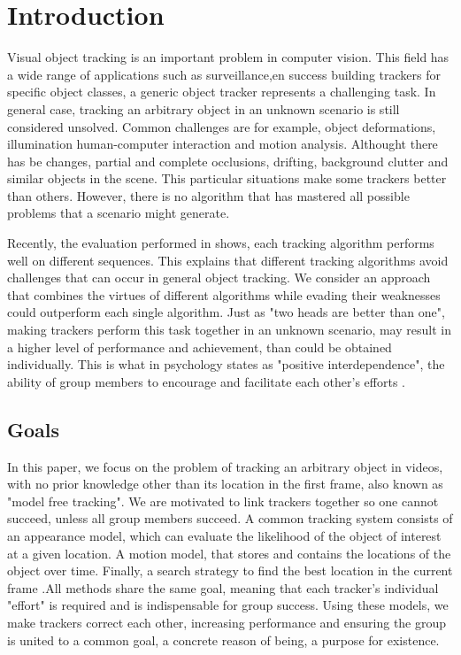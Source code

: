 
\chapter{Introduction} %

\label{Chapter1} %


Visual object tracking is an important problem in computer vision. This field has a wide range of applications such as surveillance,en success building trackers for specific object classes, a generic object tracker represents a challenging task. In general case, tracking an arbitrary object in an unknown scenario is still considered unsolved. Common challenges are for example, object deformations, illumination human-computer interaction and motion analysis. Althought there has be changes, partial and complete occlusions, drifting, background clutter and similar objects in the scene. This particular situations make some trackers better than others. However, there is no algorithm that has mastered all possible problems that a scenario might generate.

Recently, the evaluation performed in \cite{Wu2013} shows, each tracking algorithm performs well on different sequences. This explains that different tracking algorithms avoid challenges that can occur in general object tracking. We consider an approach that combines the virtues of different algorithms while evading their weaknesses could outperform each single algorithm. Just as "two heads are better than one", making trackers perform this task together in an unknown scenario, may result in a higher level of performance and achievement, than could be obtained individually. This is what in psychology states as "positive interdependence", the ability of group members to encourage and facilitate each other's efforts \cite{Johnson1998}. 


\section{Goals}

In this paper, we focus on the problem of tracking an arbitrary object in videos, with no prior knowledge other than its location in the first frame, also known as "model free tracking". We are motivated to link trackers together so one cannot succeed, unless all group members succeed. A common tracking system consists of an appearance model, which can evaluate the likelihood of the object of interest at a given location. A motion model, that stores and contains the locations of the object over time. Finally, a search strategy to find the best location in the current frame \cite{Yilmaz2006}.All methods share the same goal, meaning that each tracker's individual "effort" is required and is indispensable for group success. Using these models, we make trackers correct each other, increasing performance and ensuring the group is united to a common goal, a concrete reason of being, a purpose for existence.